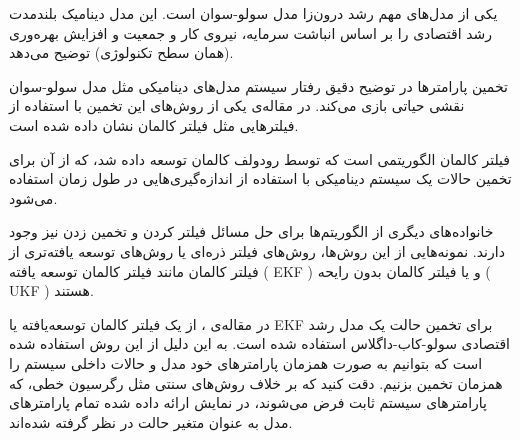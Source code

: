 \documentclass[11pt, fleqn]{article}
\begin{document}
\newhline




























\begin{multicols}{2}



	یکی از مدل‌های مهم رشد درون‌زا مدل سولو-سوان
 است. این مدل دینامیک بلندمدت رشد اقتصادی را بر اساس انباشت سرمایه، نیروی کار و جمعیت و افزایش بهره‌وری (همان سطح تکنولوژی) توضیح می‌دهد. 
 
 
 
 
 تخمین پارامتر‌ها در توضیح دقیق رفتار سیستم مدل‌های دینامیکی مثل مدل سولو-سوان نقشی حیاتی بازی می‌کند. در مقاله‌ی
 \cite{main}
یکی از روش‌های این تخمین با استفاده از فیلتر‌هایی مثل فیلتر کالمان
نشان داده شده است.  


فیلتر کالمان الگوریتمی است که توسط رودولف کالمان 
توسعه داده شد، که از آن‌ برای تخمین حالات یک سیستم‌ دینامیکی با استفاده از اندازه‌‌گیری‌هایی در طول زمان استفاده می‌شود.

 خانواده‌‌های دیگری از الگوریتم‌ها برای حل مسائل فیلتر کردن و تخمین زدن نیز وجود دارند. نمونه‌هایی از این روش‌ها، روش‌های فیلتر‌ ذره‌ای 
 یا روش‌های توسعه‌ یافته‌تری از فیلتر کالمان مانند فیلتر کالمان توسعه یافته 
 (
 EKF
 ) و یا فیلتر کالمان بدون رایحه
(
UKF
)
هستند.
 
 
 
در مقاله‌ی
\cite{main}
، از یک فیلتر کالمان توسعه‌یافته یا
 EKF
  برای تخمین حالت یک مدل رشد اقتصادی سولو-کاب-داگلاس استفاده شده است. به این دلیل از این روش استفاده شده است که بتوانیم به صورت همزمان پارامتر‌های خود مدل و حالات داخلی سیستم را همزمان تخمین بزنیم.
دقت کنید که بر خلاف روش‌های سنتی مثل رگرسیون خطی، که پارامتر‌های سیستم ثابت فرض می‌شوند، در نمایش ارائه داده شده تمام پارامتر‌های مدل به عنوان متغیر حالت در نظر گرفته شده‌اند. 


\end{multicols}
\end{document}
